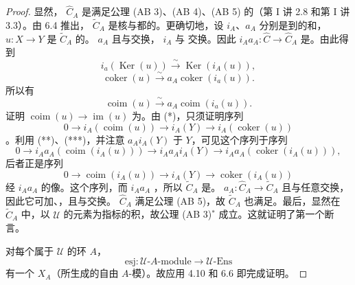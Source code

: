 \begin{proof}
显然， $\widehat C_A$ 是满足公理 (AB 3)、(AB 4)、(AB 5) 的（第 I 讲 2.8 和第 I 讲 3.3）。由 6.4 推出， $\widetilde C_A$ 是核与都的。更确切地，设 $i_A$、$a_A$ 分别是到的和，$u:X\to Y$ 是 $\widetilde C_A$ 的。 $a_A$ 且与交换， $i_A$ 与
交换。因此 $i_Aa_A:\widehat C\to\widehat C_A$ 是。由此得到
\[i_a(\operatorname{Ker}(u))\xrightarrow{\sim}\operatorname{Ker}(i_A(u)),\tag{*}\]
\[\operatorname{coker}(u)\xrightarrow{\sim}a_A\operatorname{coker}(i_a(u)).\tag{**}\]
所以有
\[\operatorname{coim}(u)\xrightarrow{\sim}a_A\operatorname{coim}(i_a(u)).\tag{***}\]
证明 $\operatorname{coim}(u)\to\operatorname{im}(u)$ 为。由 (*)，只须证明序列
\[0\longrightarrow i_A(\operatorname{coim}(u))\longrightarrow i_A(Y)\longrightarrow i_A(\operatorname{coker}(u))\]
。利用 (**)、(***)，并注意 $a_Ai_A(Y)$ 于 $Y$，可见这个序列于序列
\[0\longrightarrow i_Aa_A(\operatorname{coim}(i_A(u)))\longrightarrow i_Aa_Ai_A(Y)
\longrightarrow i_Aa_A(\operatorname{coker}(i_A(u))),\]
后者正是序列
\[0\longrightarrow\operatorname{coim}(i_A(u))\longrightarrow i_A(Y)\longrightarrow\operatorname{coker}(i_A(u))\]
经 $i_Aa_A$ 的像。这个序列，而 $i_Aa_A$ ，所以 $\widetilde C_A$ 是。 $a_A:\widehat C_A\to\widetilde C_A$ 且与任意交换，因此它可加、，且与交换。 $\widehat C_A$ 满足公理 (AB 5)，故 $\widetilde C_A$ 也满足。最后，显然在 $\widetilde C_A$ 中，以 $\mathcal U$ 的元素为指标的积，故公理 (AB 3)$^*$ 成立。这就证明了第一个断言。

对每个属于 $\mathcal U$ 的环 $A$，
\[\mathrm{esj}:\mathcal U\text{-}A\text{-}\mathrm{module}\longrightarrow\mathcal U\text{-}\mathrm{Ens}\]
有一个 $X_A$（所生成的自由 $A$-模）。故应用 4.10 和 6.6 即完成证明。
\end{proof}
